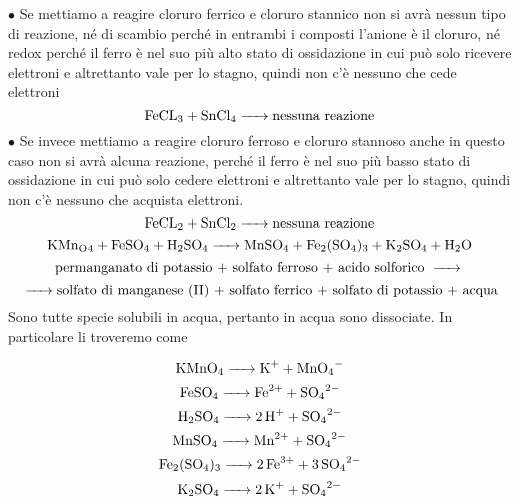 $\bullet$ Se mettiamo a reagire cloruro ferrico  e cloruro stannico  non si avrà nessun tipo di reazione, né di scambio perché in entrambi i composti l'anione è il cloruro, né redox perché il ferro è nel suo più alto stato di ossidazione in cui può solo ricevere elettroni e altrettanto vale per lo stagno, quindi non c'è nessuno che cede elettroni
$$\ce{FeCL_3 +  SnCl_4 ->}\text{nessuna reazione}$$
$\bullet$ Se invece mettiamo a reagire cloruro ferroso  e cloruro stannoso  anche in questo caso non si avrà alcuna reazione, perché il ferro è nel suo più basso stato di ossidazione in cui può solo cedere elettroni e altrettanto vale per lo stagno, quindi non c'è nessuno che acquista elettroni.
$$\ce{FeCL_2 + SnCl_2 ->}\text{nessuna reazione}$$
$$\ce{KMn_O4 + FeSO_4 + H_2SO_4 -> MnSO_4 + Fe_2(SO_4)_3 + K_2SO_4 + H_2O}$$
$$\text{permanganato di potassio + solfato ferroso + acido solforico \ce{->}}$$
$$\ce{->}\text{solfato di manganese (II) + solfato ferrico + solfato di potassio + acqua}$$
Sono tutte specie solubili in acqua, pertanto in acqua sono dissociate. In particolare li troveremo come

$$\ce{KMnO_4 -> K^+ + MnO_4^-}$$
$$\ce{FeSO_4 -> Fe^{2+} + SO_4^{2-}}$$
$$\ce{H_2SO_4 -> 2 H^+ + SO_4^{2-}}$$
$$\ce{MnSO_4 -> Mn^{2+} + SO_4^{2-}}$$
$$\ce{Fe_2(SO_4)_3 -> 2 Fe^{3+} + 3 SO_4^{2-}}$$
$$\ce{K_2SO_4 -> 2 K^+ + SO_4^{2-}}$$

